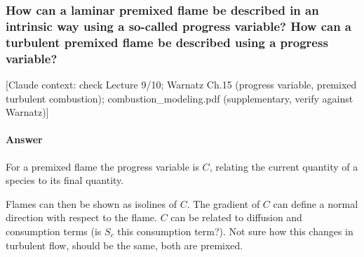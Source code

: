 \subsubsection{How can a laminar premixed flame be described in an intrinsic way using a so-called progress variable? How can a turbulent premixed flame be described using a progress variable?}

{\color{gray}\footnotesize [Claude context: check Lecture 9/10; Warnatz Ch.15 (progress variable, premixed turbulent combustion); combustion\_modeling.pdf (supplementary, verify against Warnatz)]}

\label{Q:premix progress var}

\paragraph{Answer}
For a premixed flame the progress variable is $C$, relating the current quantity of a species to its final quantity.

Flames can then be shown as isolines of $C$. The gradient of $C$ can define a normal direction with respect to the flame. $C$ can be related to diffusion and consumption terms (is $S_c$ this consumption term?).
Not sure how this changes in turbulent flow, should be the same, both are premixed.

